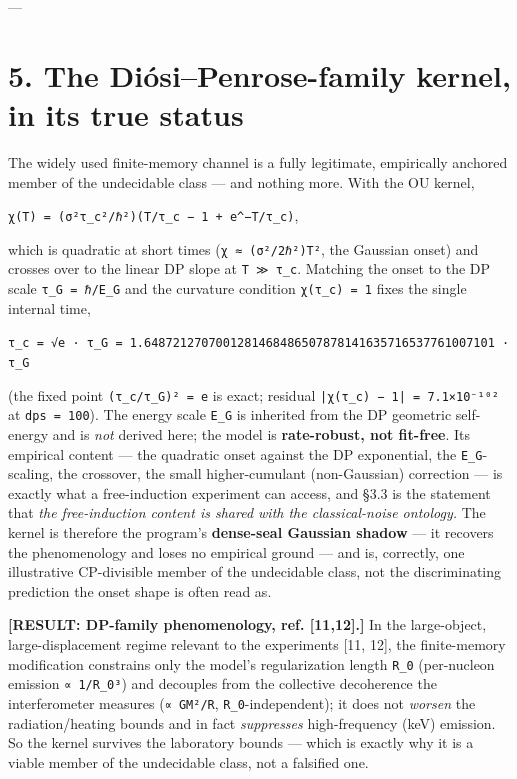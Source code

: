 \documentclass[11pt]{article}
\begin{document}
---

\section*{5. The Diósi–Penrose-family kernel, in its true status}
The widely used finite-memory channel is a fully legitimate, empirically anchored member of the undecidable class — and nothing more. With the OU kernel,

\texttt{χ(T) = (σ²τ\_c²/ℏ²)(T/τ\_c − 1 + e\textasciicircum{}{−T/τ\_c})},

which is quadratic at short times (\texttt{χ ≈ (σ²/2ℏ²)T²}, the Gaussian onset) and crosses over to the linear DP slope at \texttt{T ≫ τ\_c}. Matching the onset to the DP scale \texttt{τ\_G = ℏ/E\_G} and the curvature condition \texttt{χ(τ\_c) = 1} fixes the single internal time,

\texttt{τ\_c = √e · τ\_G = 1.6487212707001281468486507878141635716537761007101 · τ\_G}

(the fixed point \texttt{(τ\_c/τ\_G)² = e} is exact; residual \texttt{|χ(τ\_c) − 1| = 7.1×10⁻¹⁰²} at \texttt{dps = 100}). The energy scale \texttt{E\_G} is inherited from the DP geometric self-energy and is \emph{not} derived here; the model is \textbf{rate-robust, not fit-free}. Its empirical content — the quadratic onset against the DP exponential, the \texttt{E\_G}-scaling, the crossover, the small higher-cumulant (non-Gaussian) correction — is exactly what a free-induction experiment can access, and §3.3 is the statement that \emph{the free-induction content is shared with the classical-noise ontology.} The kernel is therefore the program's \textbf{dense-seal Gaussian shadow} — it recovers the phenomenology and loses no empirical ground — and is, correctly, one illustrative CP-divisible member of the undecidable class, not the discriminating prediction the onset shape is often read as.

\textbf{[RESULT: DP-family phenomenology, ref. [11,12].]} In the large-object, large-displacement regime relevant to the experiments [11, 12], the finite-memory modification constrains only the model's regularization length \texttt{R\_0} (per-nucleon emission \texttt{∝ 1/R\_0³}) and decouples from the collective decoherence the interferometer measures (\texttt{∝ GM²/R}, \texttt{R\_0}-independent); it does not \emph{worsen} the radiation/heating bounds and in fact \emph{suppresses} high-frequency (keV) emission. So the kernel survives the laboratory bounds — which is exactly why it is a viable member of the undecidable class, not a falsified one.
\end{document}
